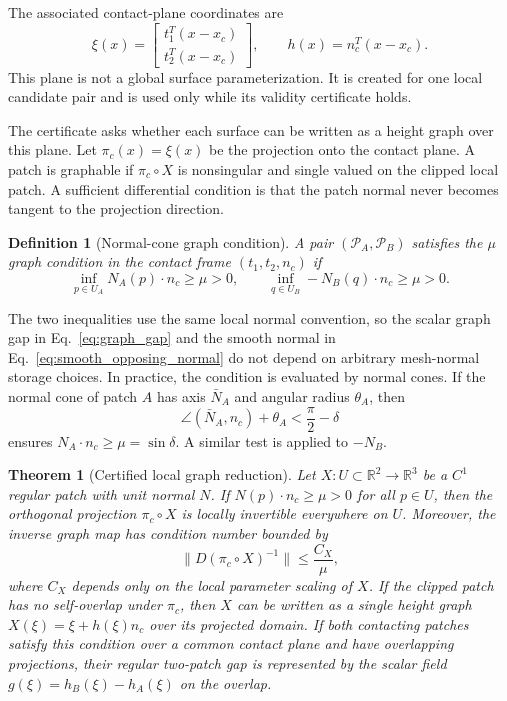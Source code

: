 \documentclass[preprint,12pt]{elsarticle}
\newtheorem{definition}{Definition}
\newtheorem{theorem}{Theorem}
\newcommand{\R}{\mathbb{R}}
\newcommand{\Pc}{\mathcal{P}}
\begin{document}
The associated contact-plane coordinates are
\begin{equation}
    \xi(x)=
    \begin{bmatrix}
    t_1^T(x-x_c)\\[2pt]
    t_2^T(x-x_c)
    \end{bmatrix},
    \qquad
    h(x)=n_c^T(x-x_c).
    \label{eq:projection_height}
\end{equation}
This plane is not a global surface parameterization. It is created for one local candidate pair and is used only while its validity certificate holds.

The certificate asks whether each surface can be written as a height graph over this plane.
\label{subsec:certificate}
Let $\pi_c(x)=\xi(x)$ be the projection onto the contact plane. A patch is graphable if $\pi_c\circ X$ is nonsingular and single valued on the clipped local patch. A sufficient differential condition is that the patch normal never becomes tangent to the projection direction.
\begin{definition}[Normal-cone graph condition]
A pair $(\Pc_A,\Pc_B)$ satisfies the $\mu$ graph condition in the contact frame $(t_1,t_2,n_c)$ if
\begin{equation}
    \inf_{p\in U_A} N_A(p)\cdot n_c\ge \mu>0,
    \qquad
    \inf_{q\in U_B} -N_B(q)\cdot n_c\ge \mu>0.
    \label{eq:mu_graph_condition}
\end{equation}
\end{definition}
The two inequalities use the same local normal convention, so the scalar graph gap in Eq.~\eqref{eq:graph_gap} and the smooth normal in Eq.~\eqref{eq:smooth_opposing_normal} do not depend on arbitrary mesh-normal storage choices. In practice, the condition is evaluated by normal cones. If the normal cone of patch $A$ has axis $\bar N_A$ and angular radius $\theta_A$, then
\begin{equation}
    \angle(\bar N_A,n_c)+\theta_A < \frac{\pi}{2}-\delta
    \label{eq:cone_test_a}
\end{equation}
ensures $N_A\cdot n_c\ge \mu=\sin\delta$. A similar test is applied to $-N_B$.

\begin{theorem}[Certified local graph reduction]
\label{thm:graph_reduction}
Let $X:U\subset\R^2\rightarrow\R^3$ be a $C^1$ regular patch with unit normal $N$. If $N(p)\cdot n_c\ge \mu>0$ for all $p\in U$, then the orthogonal projection $\pi_c\circ X$ is locally invertible everywhere on $U$. Moreover, the inverse graph map has condition number bounded by
\begin{equation}
    \|D(\pi_c\circ X)^{-1}\|\le \frac{C_X}{\mu},
    \label{eq:inverse_condition_bound}
\end{equation}
where $C_X$ depends only on the local parameter scaling of $X$. If the clipped patch has no self-overlap under $\pi_c$, then $X$ can be written as a single height graph $X(\xi)=\xi+h(\xi)n_c$ over its projected domain. If both contacting patches satisfy this condition over a common contact plane and have overlapping projections, their regular two-patch gap is represented by the scalar field $g(\xi)=h_B(\xi)-h_A(\xi)$ on the overlap.
\end{theorem}
\end{document}
